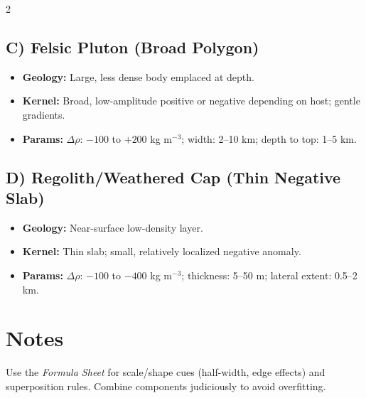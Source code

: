 \documentclass[11pt,a4paper]{article}
\begin{document}
\begin{multicols}{2}
\subsection*{C) Felsic Pluton (Broad Polygon)}
\begin{itemize}
  \item \textbf{Geology:} Large, less dense body emplaced at depth.
  \item \textbf{Kernel:} Broad, low-amplitude positive or negative depending on host; gentle gradients.
  \item \textbf{Params:} $\Delta\rho$: $-100$ to $+200$ kg m$^{-3}$; width: 2--10 km; depth to top: 1--5 km.
\end{itemize}
\begin{center}
\end{center}

\subsection*{D) Regolith/Weathered Cap (Thin Negative Slab)}
\begin{itemize}
  \item \textbf{Geology:} Near-surface low-density layer.
  \item \textbf{Kernel:} Thin slab; small, relatively localized negative anomaly.
  \item \textbf{Params:} $\Delta\rho$: $-100$ to $-400$ kg m$^{-3}$; thickness: 5--50 m; lateral extent: 0.5--2 km.
\end{itemize}
\begin{center}
\end{center}
\end{multicols}

\section*{Notes}
Use the \emph{Formula Sheet} for scale/shape cues (half-width, edge effects) and superposition rules. Combine components judiciously to avoid overfitting.
\end{document}
